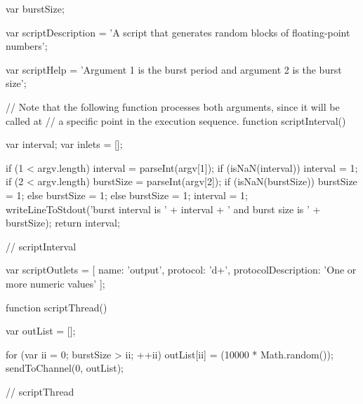 \codeBegin{}
\begin{listing}[5]{1}
var burstSize;

var scriptDescription = 'A script that generates random blocks of floating-point numbers';

var scriptHelp = 'Argument 1 is the burst period and argument 2 is the burst size';

// Note that the following function processes both arguments, since it will be called at
// a specific point in the execution sequence.
function scriptInterval()
{
    var interval;
    var inlets = [];
    
    if (1 < argv.length)
    {
        interval = parseInt(argv[1]);
        if (isNaN(interval))
        {
            interval = 1;
        }
        if (2 < argv.length)
        {
            burstSize = parseInt(argv[2]);
            if (isNaN(burstSize))
            {
                burstSize = 1;
            }
        }
        else
        {
            burstSize = 1;
        }
    }
    else
    {
        burstSize = 1;
        interval = 1;
    }
    writeLineToStdout('burst interval is ' + interval + ' and burst size is ' + burstSize);
    return interval;
} // scriptInterval

var scriptOutlets = [ { name: 'output', protocol: 'd+',
                        protocolDescription: 'One or more numeric values' } ];

function scriptThread()
{
    var outList = [];
    
    for (var ii = 0; burstSize > ii; ++ii)
    {
        outList[ii] = (10000 * Math.random());
    }
    sendToChannel(0, outList);
} // scriptThread
\end{listing}
\codeEnd{}
\secondaryEnd{}
\appendixEnd{}

